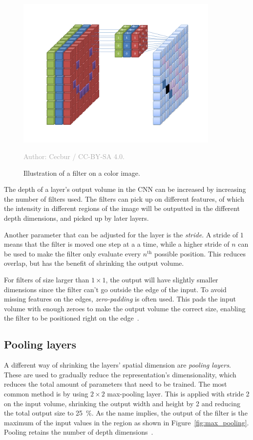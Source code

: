 \documentclass{kththesis}
\newcommand{\source}[1]{\vspace{-5mm}\caption*{\textcolor{darkgray}{Author: {#1}}\vspace{-7mm}} }
\begin{document}
\begin{figure}
  \begin{center}
    \includegraphics[width=100mm]{img/cnn_color_filter.png}
    \caption{Illustration of a filter on a color image.}
    \source{Cecbur / CC-BY-SA 4.0.}
    \label{fig:cnn_color_filter}
  \end{center}
\end{figure}

The depth of a layer's output volume in the CNN can be increased by increasing the number of filters used. The filters can pick up on different features, of which the intensity in different regions of the image will be outputted in the different depth dimensions, and picked up by later layers.

Another parameter that can be adjusted for the layer is the \textit{stride}. A stride of $1$ means that the filter is moved one step at a a time, while a higher stride of $n$ can be used to make the filter only evaluate every $n^{\text{th}}$ possible position. This reduces overlap, but has the benefit of shrinking the output volume.

For filters of size larger than $1 \times 1$, the output will have slightly smaller dimensions since the filter can't go outside the edge of the input. To avoid missing features on the edges, \textit{zero-padding} is often used. This pads the input volume with enough zeroes to make the output volume the correct size, enabling the filter to be positioned right on the edge~\cite{cnnIntro}.

\subsection{Pooling layers}
A different way of shrinking the layers' spatial dimension are \textit{pooling layers}. These are used to gradually reduce the representation's dimensionality, which reduces the total amount of parameters that need to be trained. The most common method is by using $2\times 2$ max-pooling layer. This is applied with stride 2 on the input volume, shrinking the output width and height by 2 and reducing the total output size to 25~\%. As the name implies, the output of the filter is the maximum of the input values in the region as shown in Figure~\ref{fig:max_pooling}. Pooling retains the number of depth dimensions~\cite{cnnIntro}.
\end{document}
